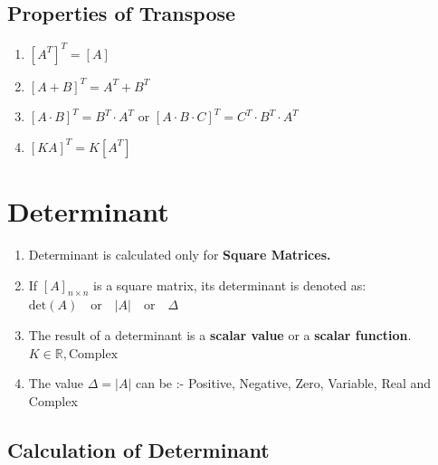 \subsection{Properties of Transpose}

\begin{enumerate}
    \item $[A^T]^T = [A]$

    \item $[A+B]^T = A^T + B^T$

    \item $[A \cdot B]^T = B^T \cdot A^T$ or $[A \cdot B \cdot C]^T = C^T \cdot B^T \cdot A^T$

    \item $[KA]^T = K[A^T]$
\end{enumerate}

\section{Determinant}

\begin{enumerate}
    \item Determinant is calculated only for \textbf{Square Matrices.}

    \item If $[A]_{n \times n}$ is a square matrix, its determinant is denoted as: $ \text{det}(A) \quad \text{or} \quad |A| \quad \text{or} \quad \Delta $

    \item The result of a determinant is a \textbf{scalar value} or a \textbf{scalar function}. $ K \in \mathbb{R}, \text{Complex} $

    \item The value $\Delta = |A|$ can be :- Positive, Negative, Zero, Variable, Real and Complex
\end{enumerate}

\subsection{Calculation of Determinant}


